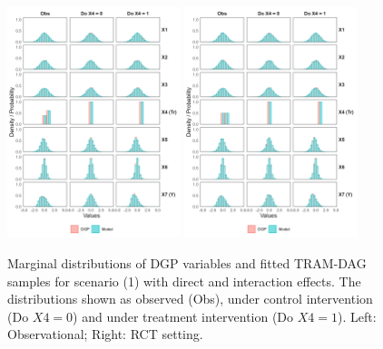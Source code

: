 \begin{figure}[htbp]
\centering
\includegraphics[width=0.45\textwidth]{img/results/observ_scenario1_sampling_distributions_vertical.png}
\includegraphics[width=0.45\textwidth]{img/results/rct_scenario1_sampling_distributions_vertical.png}
\caption{Marginal distributions of DGP variables and fitted TRAM-DAG samples for scenario (1) with direct and interaction effects. The distributions shown as observed (Obs), under control intervention (Do $X4=0$) and under treatment intervention (Do $X4=1$). Left: Observational; Right: RCT setting.}
\label{fig:scenario1_sampling_distributions_vertical}
\end{figure}

